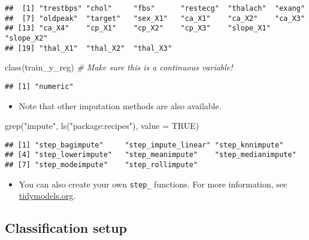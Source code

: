 \documentclass[
]{book}
\newenvironment{Shaded}{\begin{snugshade}}{\end{snugshade}}
\newcommand{\AttributeTok}[1]{\textcolor[rgb]{0.77,0.63,0.00}{#1}}
\newcommand{\CommentTok}[1]{\textcolor[rgb]{0.56,0.35,0.01}{\textit{#1}}}
\newcommand{\ConstantTok}[1]{\textcolor[rgb]{0.00,0.00,0.00}{#1}}
\newcommand{\FunctionTok}[1]{\textcolor[rgb]{0.00,0.00,0.00}{#1}}
\newcommand{\NormalTok}[1]{#1}
\newcommand{\StringTok}[1]{\textcolor[rgb]{0.31,0.60,0.02}{#1}}
\providecommand{\tightlist}{%
  \setlength{\itemsep}{0pt}\setlength{\parskip}{0pt}}
\begin{document}
\begin{verbatim}
##  [1] "trestbps" "chol"     "fbs"      "restecg"  "thalach"  "exang"   
##  [7] "oldpeak"  "target"   "sex_X1"   "ca_X1"    "ca_X2"    "ca_X3"   
## [13] "ca_X4"    "cp_X1"    "cp_X2"    "cp_X3"    "slope_X1" "slope_X2"
## [19] "thal_X1"  "thal_X2"  "thal_X3"
\end{verbatim}

\begin{Shaded}
\begin{Highlighting}[]
\FunctionTok{class}\NormalTok{(train\_y\_reg) }\CommentTok{\# Make sure this is a continuous variable!}
\end{Highlighting}
\end{Shaded}

\begin{verbatim}
## [1] "numeric"
\end{verbatim}

\begin{itemize}
\tightlist
\item
  Note that other imputation methods are also available.
\end{itemize}

\begin{Shaded}
\begin{Highlighting}[]
\FunctionTok{grep}\NormalTok{(}\StringTok{"impute"}\NormalTok{, }\FunctionTok{ls}\NormalTok{(}\StringTok{"package:recipes"}\NormalTok{), }\AttributeTok{value =} \ConstantTok{TRUE}\NormalTok{)}
\end{Highlighting}
\end{Shaded}

\begin{verbatim}
## [1] "step_bagimpute"     "step_impute_linear" "step_knnimpute"    
## [4] "step_lowerimpute"   "step_meanimpute"    "step_medianimpute" 
## [7] "step_modeimpute"    "step_rollimpute"
\end{verbatim}

\begin{itemize}
\tightlist
\item
  You can also create your own \texttt{step\_} functions. For more information, see \href{https://www.tidymodels.org/learn/develop/recipes/}{tidymodels.org}.
\end{itemize}

\hypertarget{classification-setup}{%
\subsection{Classification setup}\label{classification-setup}}
\end{document}
